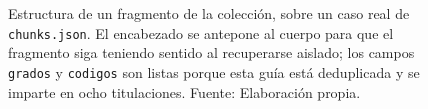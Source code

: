 \begin{figure}[H]
{%
  }
  \caption[Estructura de un fragmento (\textit{chunk})]{Estructura de un
    fragmento de la colección, sobre un caso real de \texttt{chunks.json}. El
    encabezado se antepone al cuerpo para que el fragmento siga teniendo sentido
    al recuperarse aislado; los campos \texttt{grados} y \texttt{codigos} son
    listas porque esta guía está deduplicada y se imparte en
    ocho titulaciones. Fuente: Elaboración propia.}
  \label{fig:estructura_chunk}
\end{figure}
